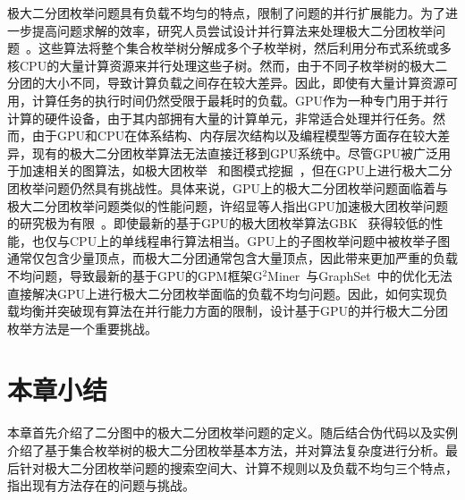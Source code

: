 极大二分团枚举问题具有负载不均匀的特点，限制了问题的并行扩展能力。为了进一步提高问题求解的效率，研究人员尝试设计并行算法来处理极大二分团枚举问题~\cite{mapreduceMBE16, MBEHe18, parMBE18}。这些算法将整个集合枚举树分解成多个子枚举树，然后利用分布式系统或多核CPU的大量计算资源来并行处理这些子树。然而，由于不同子枚举树的极大二分团的大小不同，导致计算负载之间存在较大差异。因此，即使有大量计算资源可用，计算任务的执行时间仍然受限于最耗时的负载。GPU作为一种专门用于并行计算的硬件设备，由于其内部拥有大量的计算单元，非常适合处理并行任务。然而，由于GPU和CPU在体系结构、内存层次结构以及编程模型等方面存在较大差异，现有的极大二分团枚举算法无法直接迁移到GPU系统中。尽管GPU被广泛用于加速相关的图算法，如极大团枚举~\cite{MCEGPUBitset13,MCEGPUdpp17,MCE-GPU21} 和图模式挖掘~\cite{g2miner22,SubgraphGpu22,Kclique22}，但在GPU上进行极大二分团枚举问题仍然具有挑战性。具体来说，GPU上的极大二分团枚举问题面临着与极大二分团枚举问题类似的性能问题，许绍显等人指出GPU加速极大团枚举问题的研究极为有限~\cite{MCEreview22}。即使最新的基于GPU的极大团枚举算法GBK~\cite{MCE-GPU21} 获得较低的性能，也仅与CPU上的单线程串行算法相当。GPU上的子图枚举问题中被枚举子图通常仅包含少量顶点，而极大二分团通常包含大量顶点，因此带来更加严重的负载不均问题，导致最新的基于GPU的GPM框架G$^2$Miner~\cite{g2miner22}与GraphSet~\cite{Graphset23}中的优化无法直接解决GPU上进行极大二分团枚举面临的负载不均匀问题。因此，如何实现负载均衡并突破现有算法在并行能力方面的限制，设计基于GPU的并行极大二分团枚举方法是一个重要挑战。



\section{本章小结}

本章首先介绍了二分图中的极大二分团枚举问题的定义。随后结合伪代码以及实例介绍了基于集合枚举树的极大二分团枚举基本方法，并对算法复杂度进行分析。最后针对极大二分团枚举问题的搜索空间大、计算不规则以及负载不均匀三个特点，指出现有方法存在的问题与挑战。